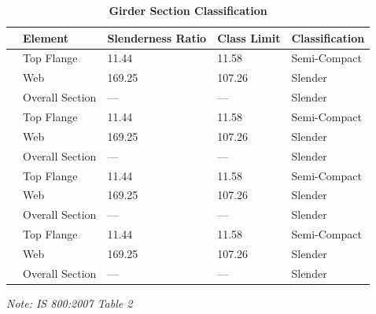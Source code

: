 \documentclass[12pt,a4paper]{report}
\numberwithin{table}{chapter}
\numberwithin{figure}{chapter}
\begin{document}
\vspace{1em}
\begin{longtable}{|C{2.5cm}|L{3cm}|C{3.5cm}|C{2.5cm}|>{\centering\arraybackslash}p{4.0cm}|}
\caption{\textbf{Girder Section Classification}}
\hline
\textbf{} & \textbf{Element} & \textbf{Slenderness Ratio} & \textbf{Class Limit} & \textbf{Classification} \\[6pt]
\hline
{} & Top Flange & 11.44 & 11.58 & Semi-Compact \\[6pt]
 & Web & 169.25 & 107.26 & Slender \\[6pt]
 & Overall Section & --- & --- & Slender \\[6pt]
\hline
{} & Top Flange & 11.44 & 11.58 & Semi-Compact \\[6pt]
 & Web & 169.25 & 107.26 & Slender \\[6pt]
 & Overall Section & --- & --- & Slender \\[6pt]
\hline
{} & Top Flange & 11.44 & 11.58 & Semi-Compact \\[6pt]
 & Web & 169.25 & 107.26 & Slender \\[6pt]
 & Overall Section & --- & --- & Slender \\[6pt]
\hline
{} & Top Flange & 11.44 & 11.58 & Semi-Compact \\[6pt]
 & Web & 169.25 & 107.26 & Slender \\[6pt]
 & Overall Section & --- & --- & Slender \\[6pt]
\hline
\end{longtable}
\noindent\textit{Note: IS 800:2007 Table 2}
\end{document}
